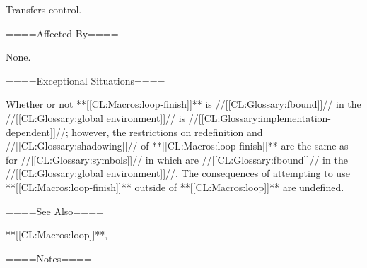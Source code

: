 Transfers control.

====Affected By====

None.

====Exceptional Situations====

Whether or not **[[CL:Macros:loop-finish]]** is //[[CL:Glossary:fbound]]// in the //[[CL:Glossary:global environment]]// is //[[CL:Glossary:implementation-dependent]]//; however, the restrictions on redefinition and //[[CL:Glossary:shadowing]]// of **[[CL:Macros:loop-finish]]** are the same as for //[[CL:Glossary:symbols]]// in  which are //[[CL:Glossary:fbound]]// in the //[[CL:Glossary:global environment]]//. The consequences of attempting to use **[[CL:Macros:loop-finish]]** outside of **[[CL:Macros:loop]]** are undefined.

====See Also====

**[[CL:Macros:loop]]**, {\secref\LoopFacility}

====Notes====

